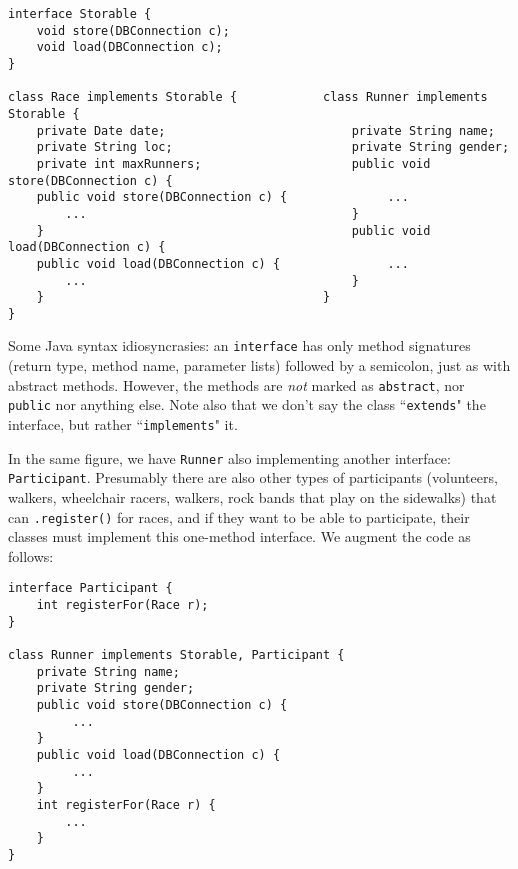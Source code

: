 \begin{Verbatim}[fontsize=\scriptsize,samepage=true,frame=single]
interface Storable {
    void store(DBConnection c);
    void load(DBConnection c);
}

class Race implements Storable {            class Runner implements Storable {                        
    private Date date;                          private String name;
    private String loc;                         private String gender;
    private int maxRunners;                     public void store(DBConnection c) {
    public void store(DBConnection c) {              ...
        ...                                     }
    }                                           public void load(DBConnection c) {
    public void load(DBConnection c) {               ...
        ...                                     }
    }                                       }                                          
}                                            
\end{Verbatim}

Some Java syntax idiosyncrasies: an \texttt{interface} has only method
signatures (return type, method name, parameter lists) followed by a
semicolon, just as with abstract methods. However, the methods are
\textit{not} marked as \texttt{abstract}, nor \texttt{public} nor anything
else. Note also that we don't say the class ``\texttt{extends}" the interface,
but rather ``\texttt{implements}" it.

In the same figure, we have \texttt{Runner} also implementing another
interface: \texttt{Participant}. Presumably there are also other types of
participants (volunteers, walkers, wheelchair racers, walkers, rock bands that
play on the sidewalks) that can \texttt{.register()} for races, and if they
want to be able to participate, their classes must implement this one-method
interface. We augment the code as follows:

\begin{Verbatim}[fontsize=\scriptsize,samepage=true,frame=single]
interface Participant {
    int registerFor(Race r);
}

class Runner implements Storable, Participant {                        
    private String name;
    private String gender;
    public void store(DBConnection c) {
         ...
    }
    public void load(DBConnection c) {
         ...
    }
    int registerFor(Race r) {
        ...
    }
}                                            
\end{Verbatim}

